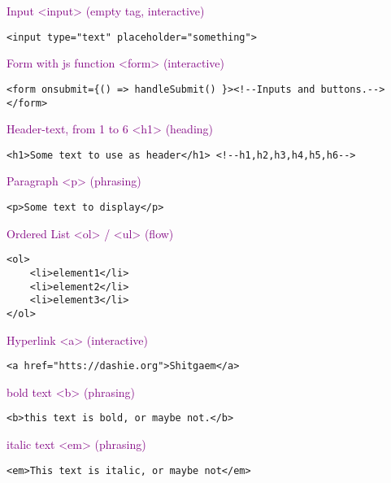 \documentclass[main.tex,fontsize=6pt,paper=a4,paper=landscape,DIV=calc,]{scrartcl}
\begin{document}
\begin{multicols*}{4}
\textcolor{purple}{Input <input> (empty tag, interactive)}
\vspace{-2mm}
\begin{lstlisting}
<input type="text" placeholder="something">
\end{lstlisting}
\vspace{2mm}

\textcolor{purple}{Form with js function <form> (interactive)}
\vspace{-2mm}
\begin{lstlisting}
<form onsubmit={() => handleSubmit() }><!--Inputs and buttons.--> </form>
\end{lstlisting}
\vspace{2mm}

\textcolor{purple}{Header-text, from 1 to 6 <h1> (heading)}
\vspace{-2mm}
\begin{lstlisting}
<h1>Some text to use as header</h1> <!--h1,h2,h3,h4,h5,h6-->
\end{lstlisting}
\vspace{2mm}

\textcolor{purple}{Paragraph <p> (phrasing)}
\vspace{-2mm}
\begin{lstlisting}
<p>Some text to display</p>
\end{lstlisting}
\vspace{2mm}

\textcolor{purple}{Ordered List <ol> / <ul> (flow)}
\vspace{-2mm}
\begin{lstlisting}
<ol>
    <li>element1</li>
    <li>element2</li>
    <li>element3</li>
</ol>
\end{lstlisting}
\vspace{2mm}

\textcolor{purple}{Hyperlink <a> (interactive)}
\vspace{-2mm}
\begin{lstlisting}
<a href="htts://dashie.org">Shitgaem</a>
\end{lstlisting}
\vspace{2mm}

\textcolor{purple}{bold text <b> (phrasing)}
\vspace{-2mm}
\begin{lstlisting}
<b>this text is bold, or maybe not.</b>
\end{lstlisting}
\vspace{2mm}

\textcolor{purple}{italic text <em> (phrasing)}
\vspace{-2mm}
\begin{lstlisting}
<em>This text is italic, or maybe not</em>
\end{lstlisting}
\vspace{2mm}


\end{multicols*}
\end{document}
